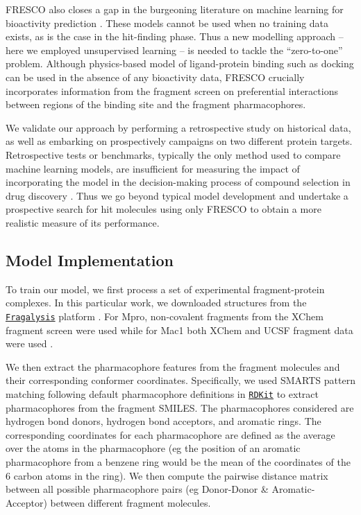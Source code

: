 FRESCO also closes a gap in the burgeoning literature on machine learning for bioactivity prediction \cite{muratov2020qsar}. These models cannot be used when no training data exists, as is the case in the hit-finding phase. Thus a new modelling approach -- here we employed unsupervised learning -- is needed to tackle the ``zero-to-one'' problem. Although physics-based model of ligand-protein binding such as docking \cite{Lyu2019UltraLargeDocking, Alon2021sigma, Fink2022Alpha} can be used in the absence of any bioactivity data, FRESCO crucially incorporates information from the fragment screen on preferential interactions between regions of the binding site and the fragment pharmacophores.

We validate our approach by performing a retrospective study on historical data, as well as embarking on prospectively campaigns on two different protein targets. Retrospective tests or benchmarks, typically the only method used to compare machine learning models, are insufficient for measuring the impact of incorporating the model in the decision-making process of compound selection in drug discovery \cite{Kearnes2021Prospective}. Thus we go beyond typical model development and undertake a prospective search for hit molecules using only FRESCO to obtain a more realistic measure of its performance.

\subsection{Model Implementation} \label{subsec:model_construction}

To train our model, we first process a set of experimental fragment-protein complexes. In this particular work, we downloaded structures from the \href{https://fragalysis.diamond.ac.uk/viewer/react/landing}{\texttt{Fragalysis}} platform \cite{Douangamath2020XChem}. For Mpro, non-covalent fragments from the XChem fragment screen \cite{Douangamath2020XChem} were used while for Mac1 both XChem and UCSF fragment data were used \cite{Schuller2021Mac1Frag}.

We then extract the pharmacophore features from the fragment molecules and their corresponding conformer coordinates. Specifically, we used SMARTS pattern matching following default pharmacophore definitions in \href{https://www.rdkit.org/docs/index.html}{\texttt{RDKit}} to extract pharmacophores from the fragment SMILES. The pharmacophores considered are hydrogen bond donors, hydrogen bond acceptors, and aromatic rings. The corresponding coordinates for each pharmacophore are defined as the average over the atoms in the pharmacophore (eg the position of an aromatic pharmacophore from a benzene ring would be the mean of the coordinates of the 6 carbon atoms in the ring). We then compute the pairwise distance matrix between all possible pharmacophore pairs (eg Donor-Donor \& Aromatic-Acceptor) between different fragment molecules.

